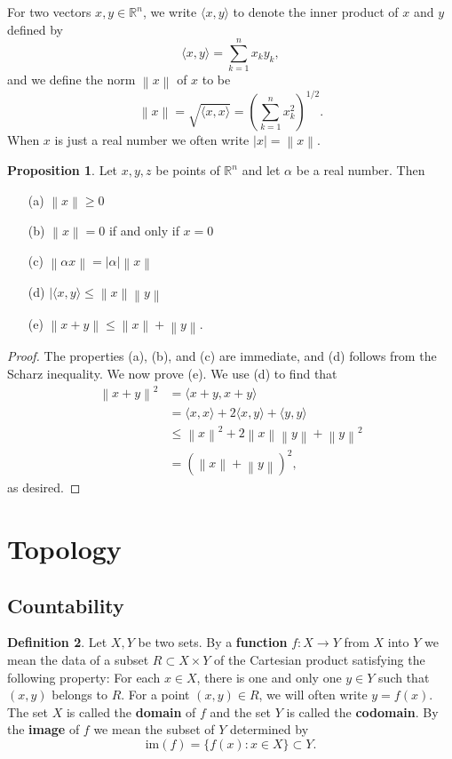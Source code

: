 \documentclass[12pt]{article}
\newcommand{\norm}[1]{\left\lVert#1\right\rVert}
\theoremstyle{definition}
\newtheorem{definition}{Definition}
\theoremstyle{theorem}
\newtheorem{proposition}[definition]{Proposition}
\begin{document}
For two vectors $x,y \in \mathbb{R}^n$, we write $\langle x, y \rangle$ to denote the inner product of $x$ and $y$ defined by 
\[
\langle x, y \rangle = \sum_{k=1}^n x_k y_k,
\]
and we define the norm $\norm{x}$ of $x$ to be 
\[
\norm{x} = \sqrt{\langle x, x \rangle} = \left(\sum_{k=1}^n x_k^2\right)^{1/2}.
\]
When $x$ is just a real number we often write $|x| = \norm{x}$. 

\begin{proposition}
Let $x,y,z$ be points of $\mathbb{R}^n$ and let $\alpha$ be a real number. Then
\begin{enumerate}
\item[(a)] $\norm{x} \geqslant 0$
\item[(b)] $\norm{x} = 0$ if and only if $x = 0$
\item[(c)] $\norm{\alpha x} = |\alpha|\norm{x}$
\item[(d)] $|\langle x, y \rangle \leqslant \norm{x}\norm{y}$ 
\item[(e)] $\norm{x + y} \leqslant \norm{x} + \norm{y}$.
\end{enumerate}
\end{proposition}

\begin{proof}
The properties (a), (b), and (c) are immediate, and (d) follows from the Scharz inequality. We now prove (e). We use (d) to find that  
\begin{align*}
\norm{x + y}^2 &= \langle x + y, x + y \rangle \\ 
&= \langle x, x \rangle + 2 \langle x, y \rangle + \langle y, y \rangle \\
&\leqslant \norm{x}^2 + 2 \norm{x}\norm{y} + \norm{y}^2 \\
&= (\norm{x} + \norm{y})^2,
\end{align*}
as desired. 
\end{proof}


\section{Topology}

\subsection{Countability}

\begin{definition}
Let $X,Y$ be two sets. By a \textbf{function} $f : X \to Y$ from $X$ into $Y$ we mean the data of a subset $R \subset X \times Y$ of the Cartesian product satisfying the following property: For each $x \in X$, there is one and only one $y \in Y$ such that $(x,y)$ belongs to $R$. For a point $(x,y) \in R$, we will often write $y = f(x)$. The set $X$ is called the \textbf{domain} of $f$ and the set $Y$ is called the \textbf{codomain}. By the \textbf{image} of $f$ we mean the subset of $Y$ determined by 
\[
\text{im}(f) = \{f(x) : x \in X \} \subset Y.
\] 
\end{definition} 
\end{document}

